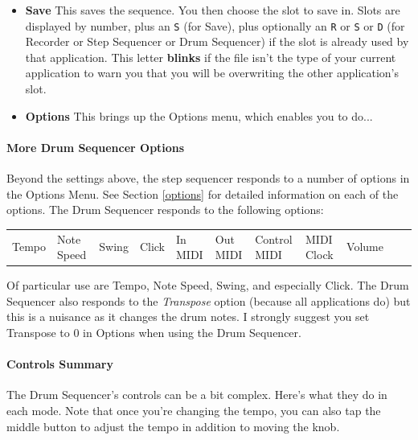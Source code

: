 \documentclass{article}
\begin{document}
\begin{itemize}
\setlength{\leftskip}{0em}

\item {\bf Save} \quad This saves the sequence. You then choose the slot to save in.  Slots are displayed by number, plus an \texttt{S} (for Save), plus optionally an \texttt{R} or \texttt{S} or \texttt{D} (for Recorder or Step Sequencer or Drum Sequencer) if the slot is already used by that application.  This letter {\bf blinks} if the file isn't the type of your current application to warn you that you will be overwriting the other application's slot.

\item {\bf Options} \quad This brings up the Options menu, which enables you to do...
\end{itemize}


\setlength{\leftskip}{0em}

\paragraph{More Drum Sequencer Options}

Beyond the settings above, the step sequencer responds to a number of options in the Options Menu.  See Section \ref{options} for detailed information on each of the options.  The Drum Sequencer responds to the following options:


\begin{center}
\begin{tabular}{lllllllllll}
Tempo& Note Speed& Swing & Click&
In MIDI& Out MIDI&Control MIDI&MIDI Clock&Volume\\
\end{tabular}
\end{center}

Of particular use are Tempo, Note Speed, Swing, and especially Click.  The Drum Sequencer also responds to the {\it Transpose} option (because all applications do) but this is a nuisance as it changes the drum notes.  I strongly suggest you set Transpose to 0 in Options when using the Drum Sequencer.


\paragraph{Controls Summary}  The Drum Sequencer's controls can be a bit complex.  Here's what they do in each mode.  Note that once you're changing the tempo, you can also tap the middle button to adjust the tempo in addition to moving the knob.
\end{document}
